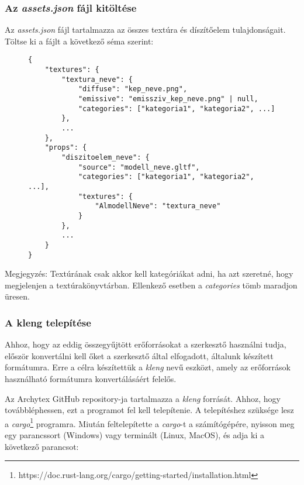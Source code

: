 \subsubsection{Az \emph{assets.json} fájl kitöltése}

Az \emph{assets.json} fájl tartalmazza az összes textúra és díszítőelem tulajdonságait. Töltse ki
a fájlt a következő séma szerint:

\begin{figure}[H]
    \centering
    \begin{minipage}{.85\textwidth}
        \centering
        \begin{lstlisting}
{
    "textures": {
        "textura_neve": {
            "diffuse": "kep_neve.png",
            "emissive": "emissziv_kep_neve.png" | null,
            "categories": ["kategoria1", "kategoria2", ...]
        },
        ...
    },
    "props": {
        "diszitoelem_neve": {
            "source": "modell_neve.gltf",
            "categories": ["kategoria1", "kategoria2", ...],
            "textures": {
                "AlmodellNeve": "textura_neve"
            }
        },
        ...
    }
}
\end{lstlisting}
    \end{minipage}
\end{figure}

Megjegyzés: Textúrának csak akkor kell kategóriákat adni, ha azt szeretné, hogy megjelenjen a
textúrakönyvtárban. Ellenkező esetben a \emph{categories} tömb maradjon üresen.

\pagebreak

\subsubsection{A kleng telepítése}

Ahhoz, hogy az eddig összegyűjtött erőforrásokat a szerkesztő használni tudja, először konvertálni
kell őket a szerkesztő által elfogadott, általunk készített formátumra. Erre a célra készítettük
a \emph{kleng} nevű eszközt, amely az erőforrások használható formátumra konvertálásáért felelős.

Az Archytex GitHub repository-ja tartalmazza a \emph{kleng} forrását. Ahhoz, hogy továbbléphessen,
ezt a programot fel kell telepítenie. A telepítéshez szüksége lesz a
\emph{cargo}\footnote{https://doc.rust-lang.org/cargo/getting-started/installation.html}
programra. Miután feltelepítette a \emph{cargo}-t a számítógépére, nyisson meg egy parancssort
(Windows) vagy terminált (Linux, MacOS), és adja ki a következő parancsot:

